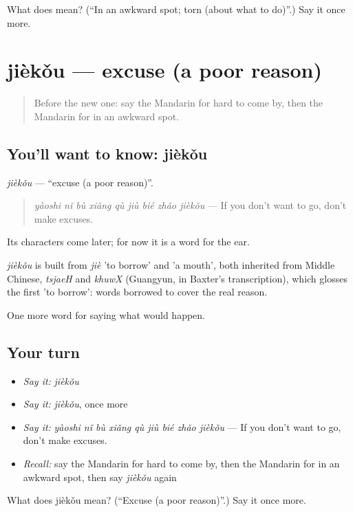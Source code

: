 \begin{tcolorbox}[breakable,colback=teal!4,colframe=teal!35!black,title={Before you move on}]
What does  mean? (\textquotedblleft{}In an awkward spot; torn (about what to do)\textquotedblright{}.) Say it once more.
\end{tcolorbox}
\section[jièkǒu]{jièkǒu — excuse (a poor reason)}

\label{lesson:ZH-C397-jiekou}



\begin{quote}
Before the new one: say the Mandarin for hard to come by, then the Mandarin for in an awkward spot.
\end{quote}

\subsection*{You'll want to know: jièkǒu}
\emph{jièkǒu} — \textquotedblleft{}excuse (a poor reason)\textquotedblright{}.

\begin{quote}
\emph{yàoshi nǐ bù xiǎng qù jiù bié zhǎo jièkǒu} — If you don't want to go, don't make excuses.
\end{quote}

Its characters come later; for now it is a word for the ear.

\begin{cousinweb}
\emph{jièkǒu} is built from \emph{jiè} 'to borrow' and  'a mouth', both inherited from Middle Chinese, \emph{tsjaeH} and \emph{khuwX} (Guangyun, in Baxter's transcription), which glosses the first 'to borrow': words borrowed to cover the real reason.
\end{cousinweb}

\begin{grammarlens}[title={What you've built}]
One more word for saying what would happen.
\end{grammarlens}

\subsection*{Your turn}
\begin{itemize}
\raggedright
  \item \emph{Say it:} \emph{jièkǒu}
  \item \emph{Say it:} \emph{jièkǒu}, once more
  \item \emph{Say it:} \emph{yàoshi nǐ bù xiǎng qù jiù bié zhǎo jièkǒu} — If you don't want to go, don't make excuses.
  \item \emph{Recall:} say the Mandarin for hard to come by, then the Mandarin for in an awkward spot, then say \emph{jièkǒu} again
\end{itemize}

\begin{tcolorbox}[breakable,colback=teal!4,colframe=teal!35!black,title={Before you move on}]
What does jièkǒu mean? (\textquotedblleft{}Excuse (a poor reason)\textquotedblright{}.) Say it once more.
\end{tcolorbox}
